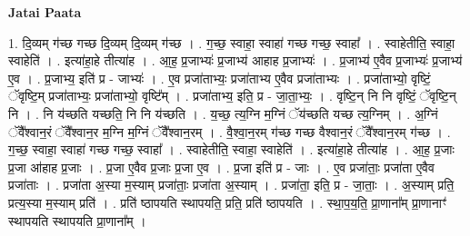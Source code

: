 \documentclass[17pt]{extarticle}
\begin{document}
\textbf{Jatai Paata} \newline

1. दि॒व्यम् ग॑च्छ गच्छ दि॒व्यम् दि॒व्यम् ग॑च्छ । . ग॒च्छ॒ स्वाहा॒ स्वाहा॑ गच्छ गच्छ॒ स्वाहा᳚ । . स्वाहेतीति॒ स्वाहा॒ स्वाहेति॑ । . इत्या॑हा॒हे तीत्या॑ह । . आ॒ह॒ प्र॒जाभ्यः॑ प्र॒जाभ्य॑ आहाह प्र॒जाभ्यः॑ । . प्र॒जाभ्य॑ ए॒वैव प्र॒जाभ्यः॑ प्र॒जाभ्य॑ ए॒व । . प्र॒जाभ्य॒ इति॑ प्र - जाभ्यः॑ । . ए॒व प्रजा॑ताभ्यः॒ प्रजा॑ताभ्य ए॒वैव प्रजा॑ताभ्यः । . प्रजा॑ताभ्यो॒ वृष्टिं॒ ॅवृष्टि॒म् प्रजा॑ताभ्यः॒ प्रजा॑ताभ्यो॒ वृष्टि᳚म् । . प्रजा॑ताभ्य॒ इति॒ प्र - जा॒ता॒भ्यः॒ । . वृष्टि॒न् नि नि वृष्टिं॒ ॅवृष्टि॒न् नि । . नि य॑च्छति यच्छति॒ नि नि य॑च्छति । . य॒च्छ॒ त्य॒ग्नि म॒ग्निं ॅय॑च्छति यच्छ त्य॒ग्निम् । . अ॒ग्निं ॅवै᳚श्वान॒रं ॅवै᳚श्वान॒र म॒ग्नि म॒ग्निं ॅवै᳚श्वान॒रम् । . वै॒श्वा॒न॒रम् ग॑च्छ गच्छ वैश्वान॒रं ॅवै᳚श्वान॒रम् ग॑च्छ । . ग॒च्छ॒ स्वाहा॒ स्वाहा॑ गच्छ गच्छ॒ स्वाहा᳚ । . स्वाहेतीति॒ स्वाहा॒ स्वाहेति॑ । . इत्या॑हा॒हे तीत्या॑ह । . आ॒ह॒ प्र॒जाः प्र॒जा आ॑हाह प्र॒जाः । . प्र॒जा ए॒वैव प्र॒जाः प्र॒जा ए॒व । . प्र॒जा इति॑ प्र - जाः । . ए॒व प्रजा॑ताः॒ प्रजा॑ता ए॒वैव प्रजा॑ताः । . प्रजा॑ता अ॒स्या म॒स्याम् प्रजा॑ताः॒ प्रजा॑ता अ॒स्याम् । . प्रजा॑ता॒ इति॒ प्र - जा॒ताः॒ । . अ॒स्याम् प्रति॒ प्रत्य॒स्या म॒स्याम् प्रति॑ । . प्रति॑ ष्ठापयति स्थापयति॒ प्रति॒ प्रति॑ ष्ठापयति । . स्था॒प॒य॒ति॒ प्रा॒णाना᳚म् प्रा॒णानाꣳ॑ स्थापयति स्थापयति प्रा॒णाना᳚म् । \newline
\end{document}
